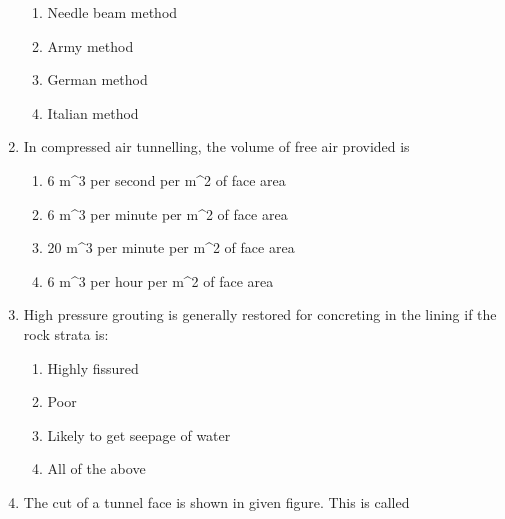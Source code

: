 \documentclass[11pt,a4paper]{article}
\begin{document}
\begin{enumerate}
\begin{enumerate}[label=\Alph*.]
\item{Needle beam method}
\item{Army method}
\item{German method}
\item{Italian method}
\end{enumerate}
\item{In compressed air tunnelling, the volume of free air provided is}
\begin{enumerate}[label=\Alph*.]
\item{6 m\^{}3 per second per m\^{}2 of face area}
\item{6 m\^{}3 per minute per m\^{}2 of face area}
\item{20 m\^{}3 per minute per m\^{}2 of face area}
\item{6 m\^{}3 per hour per m\^{}2 of face area}
\end{enumerate}
\item{High pressure grouting is generally restored for concreting in the lining if the rock strata is:}
\begin{enumerate}[label=\Alph*.]
\item{Highly fissured}
\item{Poor}
\item{Likely to get seepage of water}
\item{All of the above}
\end{enumerate}
\item{The cut of a tunnel face is shown in given figure. This is called \\

}
\end{enumerate}
\end{document}
